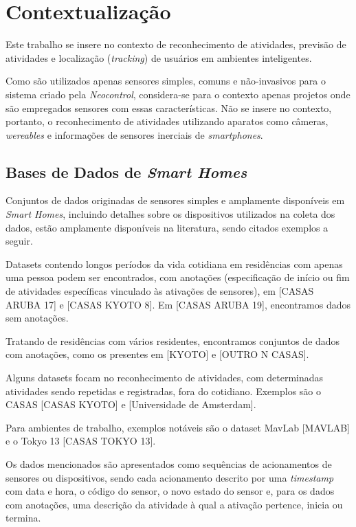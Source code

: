 \documentclass[
	12pt,				%
	openright,			%
	twoside,			%
	a4paper,			%
	english,			%
	spanish,			%
	brazil,				%
	]{abntex2}\usepackage[]{graphicx}\usepackage[]{color}
\begin{document}

\chapter{Contextualização}

Este trabalho se insere no contexto de reconhecimento de atividades, previsão de atividades e localização (\textit{tracking}) de usuários em ambientes inteligentes.

Como são utilizados apenas sensores simples, comuns e não-invasivos para o sistema criado pela \textit{Neocontrol}, considera-se para o contexto apenas projetos onde são empregados sensores com essas características. Não se insere no contexto, portanto, o reconhecimento de atividades utilizando aparatos como câmeras, \textit{wereables} e informações de sensores inerciais de \textit{smartphones}.

\section{Bases de Dados de \textit{Smart Homes}}

Conjuntos de dados originadas de sensores simples e amplamente disponíveis em \textit{Smart Homes}, incluindo detalhes sobre os dispositivos utilizados na coleta dos dados, estão amplamente disponíveis na literatura, sendo citados exemplos a seguir.

Datasets contendo longos períodos da vida cotidiana em residências com apenas uma pessoa podem ser encontrados, com anotações (especificação de início ou fim de atividades específicas vinculado às ativações de sensores), em [CASAS ARUBA 17] e [CASAS KYOTO 8]. Em [CASAS ARUBA 19], encontramos dados sem anotações. 

Tratando de residências com vários residentes, encontramos conjuntos de dados com anotações, como os presentes em [KYOTO] e [OUTRO N CASAS].

Alguns datasets focam no reconhecimento de atividades, com determinadas atividades sendo repetidas e registradas, fora do cotidiano. Exemplos são o CASAS [CASAS KYOTO] e [Universidade de Amsterdam].

Para ambientes de trabalho, exemplos notáveis são o dataset MavLab [MAVLAB] e o Tokyo 13 [CASAS TOKYO 13].

Os dados mencionados são apresentados como sequências de acionamentos de sensores ou dispositivos, sendo cada acionamento descrito por uma \textit{timestamp} com data e hora, o código do sensor, o novo estado do sensor e, para os dados com anotações, uma descrição da atividade à qual a ativação pertence, inicia ou termina.
\end{document}
